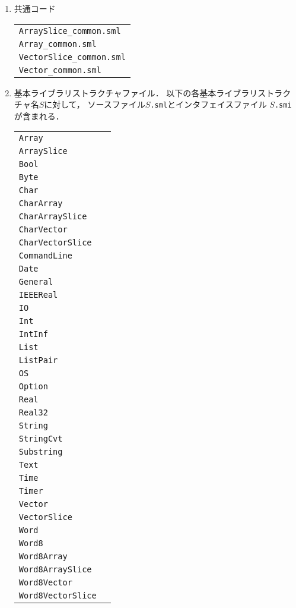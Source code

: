 \documentclass{jbook}
\newcommand{\code}[1]{\mbox{\large\tt #1}}
\begin{document}
\begin{enumerate}
\item 共通コード

\begin{tabular}{l}
\code{ArraySlice\_common.sml}\\
\code{Array\_common.sml}\\
\code{VectorSlice\_common.sml}\\
\code{Vector\_common.sml}
\end{tabular}

\item 基本ライブラリストラクチャファイル．
	以下の各基本ライブラリストラクチャ名$S$に対して，
	ソースファイル\code{$S$.sml}とインタフェイスファイル
\code{$S$.smi}が含まれる．

\begin{tabular}{ll}
\code{Array}& \\
\code{ArraySlice}& \\
\code{Bool}& \\
\code{Byte}& \\
\code{Char}& \\
\code{CharArray}& \\
\code{CharArraySlice}& \\
\code{CharVector}& \\
\code{CharVectorSlice}& \\
\code{CommandLine}& \\
\code{Date}& \\
\code{General}& \\
\code{IEEEReal}& \\
\code{IO}& \\
\code{Int}& \\
\code{IntInf}& \\
\code{List}& \\
\code{ListPair}& \\
\code{OS}& \\
\code{Option}& \\
\code{Real}& \\
\code{Real32}& \\
\code{String}& \\
\code{StringCvt}& \\
\code{Substring}& \\
\code{Text}& \\
\code{Time}& \\
\code{Timer}& \\
\code{Vector}& \\
\code{VectorSlice}& \\
\code{Word}& \\
\code{Word8}& \\
\code{Word8Array}& \\
\code{Word8ArraySlice}& \\
\code{Word8Vector}& \\
\code{Word8VectorSlice}
\end{tabular}


\end{enumerate}
\end{document}
